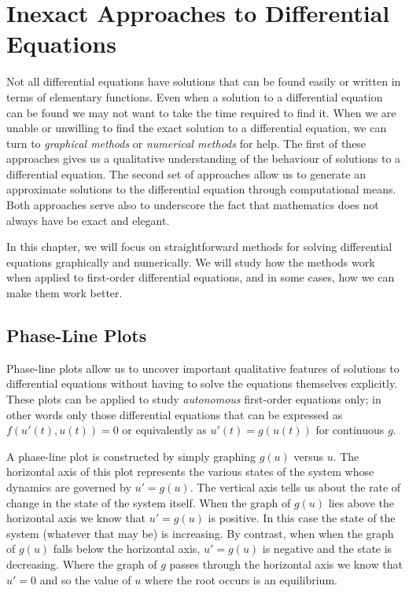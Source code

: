 \documentclass[../book.tex]{subfiles}
\begin{document}
\chapter{Inexact Approaches to Differential Equations}\label{ch:inexact}

Not all differential equations have solutions that can be found easily or written in terms of elementary functions. Even when a solution to a differential equation can be found we may not want to take the time required to find it. When we are unable or unwilling to find the exact solution to a differential equation, we can turn to \emph{graphical methods} or \emph{numerical methods} for help. The first of these approaches gives us a qualitative understanding of the behaviour of solutions to a differential equation. The second set of approaches allow us to generate an approximate solutions to the differential equation through computational means. Both approaches serve  also to underscore the fact that mathematics does not always have be exact and elegant.

In this chapter, we will focus on straightforward methods for solving differential equations graphically and numerically. We will study how the methods work when applied to first-order differential equations, and in some cases, how we can make them work better.

\section{Phase-Line Plots}

Phase-line plots allow us to uncover important qualitative features of solutions to differential equations without having to solve the equations themselves explicitly. These plots can be applied to study \emph{autonomous} first-order equations only; in other words only those differential equations that can be expressed as \(f(u'(t) , u(t) ) =0\) or equivalently as \(u'(t) = g(u(t))\) for continuous \(g\).

A phase-line plot is constructed by simply graphing \(g(u)\) versus \(u\). The horizontal axis of this plot represents the various states of the system whose dynamics are governed by \(u' = g(u)\). The vertical axis tells us about the rate of change in the state of the system itself. When the graph of \(g(u)\) lies above the horizontal axis we know that \(u' = g(u)\) is positive. In this case the state of the system (whatever that may be) is increasing. By contrast, when when the graph of \(g(u)\) falls below the horizontal axis, \(u' = g(u)\) is negative and the state is decreasing. Where the graph of \(g\) passes through the horizontal axis we know that \(u' =0\) and so the value of \(u\) where the root occurs is an equilibrium.
\end{document}

